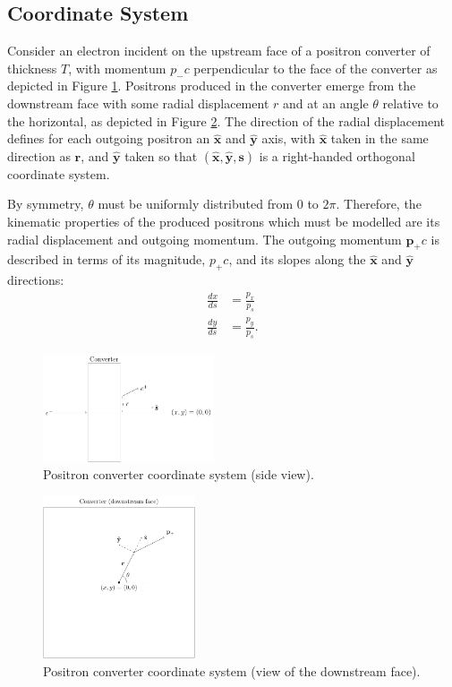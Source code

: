 \documentclass[letter,
               biblatex,     %
               keeplastbox,   %
               ]{jacow}
\newcommand{\xx}{\mathbf{\hat{x}}}
\newcommand{\yy}{\mathbf{\hat{y}}}
\newcommand{\rrr}{\mathbf{r}}
\begin{document}
\subsection{Coordinate System}

Consider an electron incident on the upstream face of a positron converter of thickness $T$, with momentum $p_- c$ perpendicular to the face of the converter as depicted in Figure \ref{fig:coords1}.
Positrons produced in the converter emerge from the downstream face with some radial displacement $r$ and at an angle $\theta$ relative to the horizontal, as depicted in Figure \ref{fig:coords2}.
The direction of the radial displacement defines for each outgoing positron an $\xx$ and $\yy$ axis, with $\xx$ taken in the same direction as $\rrr$, and $\yy$ taken so that $(\xx, \yy, \mathbf{s})$ is a right-handed orthogonal coordinate system.

By symmetry, $\theta$ must be uniformly distributed from 0 to $2\pi$.
Therefore, the kinematic properties of the produced positrons which must be modelled are its radial displacement and outgoing momentum.
The outgoing momentum $\mathbf{p}_+ c$ is described in terms of its magnitude, $p_+ c$, and its slopes along the $\xx$ and $\yy$ directions:
\begin{align}
\frac{dx}{ds} & = \frac{p_x}{p_s} \\
\frac{dy}{ds} & = \frac{p_y}{p_s}.
\end{align}


\begin{figure}
\centering
\includegraphics[width=0.45\textwidth]{coords1.pdf}
\caption{Positron converter coordinate system (side view).}
\label{fig:coords1}
\end{figure}

\begin{figure}
\centering
\includegraphics[width=0.4\textwidth]{coords2.pdf}
\caption{Positron converter coordinate system (view of the downstream face).}
\label{fig:coords2}
\end{figure}
\end{document}
